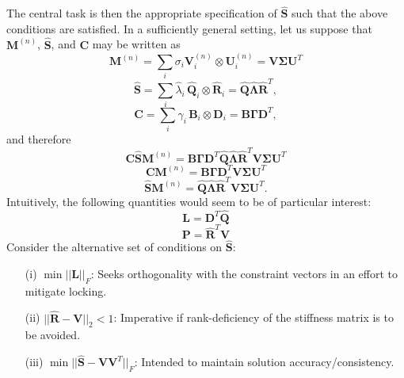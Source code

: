 \documentclass[12pt]{article}
\begin{document}
The central task is then the appropriate specification of $\hat{\mathbf{S}}$ such that the above conditions are satisfied. In a sufficiently general setting, let us suppose that $\mathbf{M}^{(n)}$, $\hat{\mathbf{S}}$, and $\mathbf{C}$ may be written as
\begin{equation}
                \mathbf{M}^{(n)} = \sum_i \sigma_i \mathbf{V}^{(n)}_i \otimes \mathbf{U}^{(n)}_i = \mathbf{V} \mathbf{\Sigma} \mathbf{U}^T
        \end{equation}
\begin{equation}
        \hat{\mathbf{S}} = \sum_i \hat{\lambda}_i \, \hat{\mathbf{Q}}_i \otimes \hat{\mathbf{R}}_i = \hat{\mathbf{Q}} \hat{\mathbf{\Lambda}} \hat{\mathbf{R}}^T,
\end{equation}
\begin{equation}
        \mathbf{C} = \sum_i \gamma_i \, \mathbf{B}_i \otimes \mathbf{D}_i = \mathbf{B} \mathbf{\Gamma} \mathbf{D}^T,
\end{equation}
and therefore
\begin{equation}
        \mathbf{C} \hat{\mathbf{S}} \mathbf{M}^{(n)} = \mathbf{B} \mathbf{\Gamma} \mathbf{D}^T \hat{\mathbf{Q}} \hat{\mathbf{\Lambda}} \hat{\mathbf{R}}^T \mathbf{V} \mathbf{\Sigma} \mathbf{U}^T
\end{equation}
\begin{equation}
        \mathbf{CM}^{(n)} = \mathbf{B} \mathbf{\Gamma} \mathbf{D}^T \mathbf{V} \mathbf{\Sigma} \mathbf{U}^T
\end{equation}
\begin{equation}
        \hat{\mathbf{S}} \mathbf{M}^{(n)} = \hat{\mathbf{Q}} \hat{\mathbf{\Lambda}} \hat{\mathbf{R}}^T \mathbf{V} \mathbf{\Sigma} \mathbf{U}^T.
\end{equation}
Intuitively, the following quantities would seem to be of particular interest:
\begin{equation}
        \mathbf{L} = \mathbf{D}^T \hat{\mathbf{Q}}
\end{equation}
\begin{equation}
        \mathbf{P} = \hat{\mathbf{R}}^T \mathbf{V}
\end{equation}
Consider the alternative set of conditions on $\hat{\mathbf{S}}$:
\begin{itemize}
        \item[(i)] $\min || \mathbf{L} ||_F$: Seeks orthogonality with the constraint vectors in an effort to mitigate locking.
        \item[(ii)] $|| \hat{\mathbf{R}} - \mathbf{V} ||_2 < 1$: Imperative if rank-deficiency of the stiffness matrix is to be avoided.
        \item[(iii)] $\min || \hat{\mathbf{S}} - \mathbf{V} \mathbf{V}^T ||_F$: Intended to maintain solution accuracy/consistency.
\end{itemize}
\end{document}
